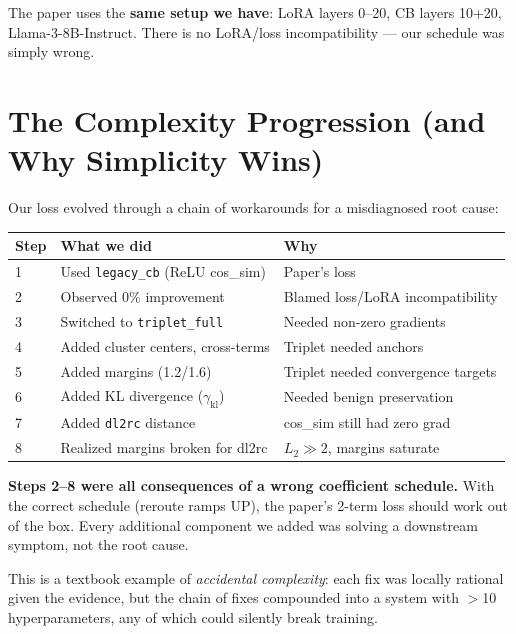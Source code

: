 \documentclass[11pt]{article}
\begin{document}
The paper uses the \textbf{same setup we have}: LoRA layers 0--20, CB layers
10+20, Llama-3-8B-Instruct. There is no LoRA/loss incompatibility --- our
schedule was simply wrong.

\section{The Complexity Progression (and Why Simplicity Wins)}

Our loss evolved through a chain of workarounds for a misdiagnosed root cause:

\begin{center}
\small
\begin{tabular}{lll}
\toprule
Step & What we did & Why \\
\midrule
1 & Used \texttt{legacy\_cb} (ReLU cos\_sim) & Paper's loss \\
2 & Observed 0\% improvement & Blamed loss/LoRA incompatibility \\
3 & Switched to \texttt{triplet\_full} & Needed non-zero gradients \\
4 & Added cluster centers, cross-terms & Triplet needed anchors \\
5 & Added margins (1.2/1.6) & Triplet needed convergence targets \\
6 & Added KL divergence ($\gamma_\mathrm{kl}$) & Needed benign preservation \\
7 & Added \texttt{dl2rc} distance & cos\_sim still had zero grad \\
8 & Realized margins broken for dl2rc & $L_2 \gg 2$, margins saturate \\
\bottomrule
\end{tabular}
\end{center}

\textbf{Steps 2--8 were all consequences of a wrong coefficient schedule.}
With the correct schedule (reroute ramps UP), the paper's 2-term loss should
work out of the box. Every additional component we added was solving a
downstream symptom, not the root cause.

This is a textbook example of \emph{accidental complexity}: each fix was
locally rational given the evidence, but the chain of fixes compounded into
a system with $>$10 hyperparameters, any of which could silently break training.

\end{document}
